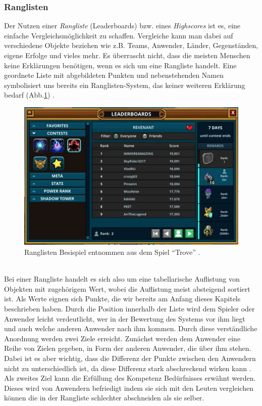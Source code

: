 \documentclass[a4paper,12pt,twoside]{scrartcl}
\begin{document}
\subsubsection{Ranglisten}
\label{Ranglisten}
Der Nutzen einer \textit{Rangliste} (Leaderboards) bzw. eines \textit{Highscores} ist es, eine einfache Vergleichsmöglichkeit zu schaffen. Vergleiche kann man dabei auf verschiedene Objekte beziehen wie z.B. Teams, Anwender, Länder, Gegenständen, eigene Erfolge und vieles mehr. Es überrascht nicht, dass die meisten Menschen keine Erklärungen benötigen, wenn es sich um eine Rangliste handelt. Eine geordnete Liste mit abgebildeten Punkten und nebenstehenden Namen symbolisiert uns bereits ein Ranglisten-System, das keiner weiteren Erklärung bedarf (Abb.\ref{RanglistenBild}) \cite{Zichermann2011}.
\\
\begin{figure}[h!]
\begin{center}
\includegraphics[scale = 0.3]{Bilder/Ranglisten.eps}
\caption{Ranglisten Besispiel entnommen aus dem Spiel \enquote{Trove} \cite{Leaderboards}.}
\label{RanglistenBild}
\end{center}
\end{figure} 
\\ 
Bei einer Rangliste handelt es sich also um eine tabellarische Auflistung von Objekten mit zugehörigem Wert, wobei die Auflistung meist absteigend sortiert ist. Als Werte eignen sich Punkte, die wir bereits am Anfang dieses Kapitels beschrieben haben. Durch die Position innerhalb der Liste wird dem Spieler oder Anwender leicht verdeutlicht, wer in der Bewertung des Systems vor ihm liegt und auch welche anderen Anwender nach ihm kommen. Durch diese verständliche Anordnung werden zwei Ziele erreicht. Zunächst werden dem Anwender eine Reihe von Zielen gegeben, in Form der anderen Anwender, die über ihm stehen. Dabei ist es aber wichtig, dass die Differenz der Punkte zwischen den Anwendern nicht zu unterschiedlich ist, da diese Differenz stark abschreckend wirken kann \cite{Zichermann2011}. Als zweites Ziel kann die Erfüllung des Kompetenz Bedürfnisses erwähnt werden. Dieses wird von Anwendern befriedigt indem sie sich mit den Leuten vergleichen können die in der Rangliste schlechter abschneiden als sie selber. 
\end{document}
